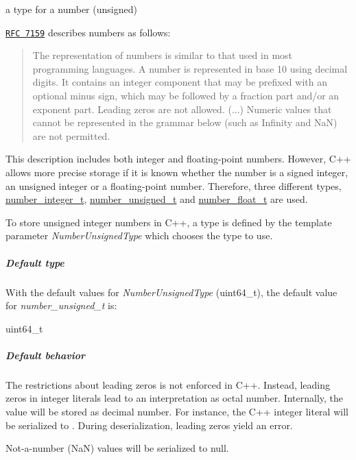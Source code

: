 a type for a number (unsigned) 

\href{http://rfc7159.net/rfc7159}{\tt R\+FC 7159} describes numbers as follows\+: \begin{quote}
The representation of numbers is similar to that used in most programming languages. A number is represented in base 10 using decimal digits. It contains an integer component that may be prefixed with an optional minus sign, which may be followed by a fraction part and/or an exponent part. Leading zeros are not allowed. (...) Numeric values that cannot be represented in the grammar below (such as Infinity and NaN) are not permitted. \end{quote}


This description includes both integer and floating-\/point numbers. However, C++ allows more precise storage if it is known whether the number is a signed integer, an unsigned integer or a floating-\/point number. Therefore, three different types, \hyperlink{classnlohmann_1_1basic__json_a11e390944da90db83089eb2426a749d3}{number\+\_\+integer\+\_\+t}, \hyperlink{classnlohmann_1_1basic__json_ae09af9c23351b7245d9be4d1b2035fef}{number\+\_\+unsigned\+\_\+t} and \hyperlink{classnlohmann_1_1basic__json_a5b8abaebd922d82d69756327c0c347e6}{number\+\_\+float\+\_\+t} are used.

To store unsigned integer numbers in C++, a type is defined by the template parameter {\itshape Number\+Unsigned\+Type} which chooses the type to use.

\subparagraph*{Default type}

With the default values for {\itshape Number\+Unsigned\+Type} ({\ttfamily uint64\+\_\+t}), the default value for {\itshape number\+\_\+unsigned\+\_\+t} is\+:


\begin{DoxyCode}
uint64\_t
\end{DoxyCode}


\subparagraph*{Default behavior}


\begin{DoxyItemize}
\item The restrictions about leading zeros is not enforced in C++. Instead, leading zeros in integer literals lead to an interpretation as octal number. Internally, the value will be stored as decimal number. For instance, the C++ integer literal {} will be serialized to {}. During deserialization, leading zeros yield an error.
\item Not-\/a-\/number (NaN) values will be serialized to {\ttfamily null}.
\end{DoxyItemize}

